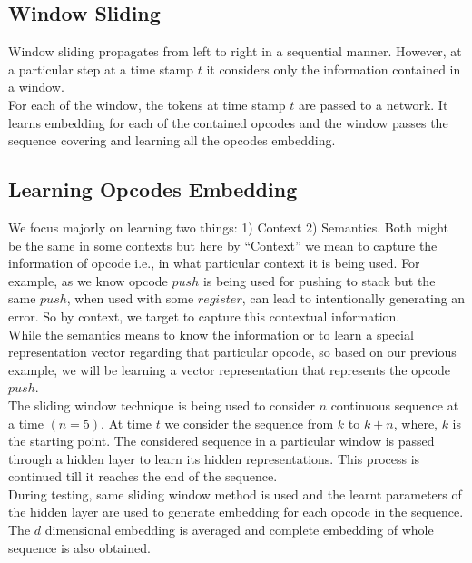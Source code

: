 \documentclass[conference]{IEEEtran}
\begin{document}
\subsection{Window Sliding}
Window sliding propagates from left to right in a sequential manner. However, at a particular step at a time stamp \(t\) it considers only the information contained in a window.\\
For each of the window, the tokens at time stamp \(t\) 
are passed to a network. It learns embedding for each of the contained opcodes and the window passes the sequence covering and learning all the opcodes embedding.

\subsection{Learning Opcodes Embedding}
We focus majorly on learning two things: 1) Context 2) Semantics. Both might be the same in some contexts but here by “Context” we mean to capture the information of opcode i.e., in what particular context it is being used. For example, as we know opcode \(push\) is being used for pushing to stack but the same \(push\), when used with some \(register\), can lead to intentionally generating an error. So by context, we target to capture this contextual information.\\
While the semantics means to know the information or to learn a special representation vector regarding that particular opcode, so based on our previous example, we will be learning a vector
representation that represents the opcode \(push\).\\
The sliding window technique is being used to consider \(n\) continuous sequence at a time \((n=5)\). At time \(t\) we consider the sequence from \(k\) to \(k+n\), where, \(k\) is the starting point. The considered sequence in a particular window is passed through a hidden layer to learn its hidden representations. This process is continued till it reaches the end of the sequence.\\
During testing, same sliding window method is used and the learnt parameters of the hidden layer are used to generate embedding for each opcode in the sequence. The \(d\) dimensional embedding is averaged and complete embedding of whole sequence is also obtained.
\end{document}
